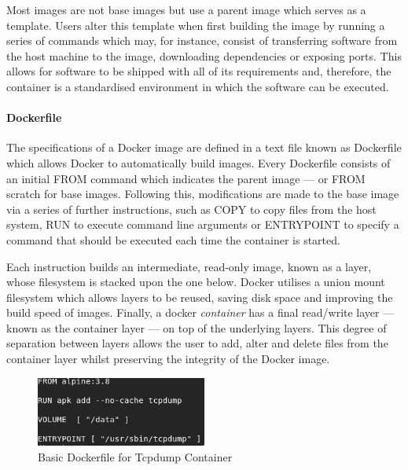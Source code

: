 \documentclass[msc,deptreport, cs]{infthesis} %
\begin{document}
Most images are not base images but use a parent image which serves as a template. Users alter this template when first building the image by running a series of commands which may, for instance, consist of transferring software from the host machine to the image, downloading dependencies or exposing ports. This allows for software to be shipped with all of its requirements and, therefore, the container is a standardised environment in which the software can be executed.


\paragraph*{Dockerfile}

   The specifications of a Docker image are defined in a text file known as Dockerfile which allows Docker to automatically build images. Every Dockerfile consists of an initial FROM command which indicates the parent image --- or FROM scratch for base images. Following this, modifications are made to the base image via a series of further instructions, such as COPY to copy files from the host system, RUN to execute command line arguments or ENTRYPOINT to specify a command that should be executed each time the container is started.
   
  Each instruction builds an intermediate, read-only image, known as a layer, whose filesystem is stacked upon the one below. Docker utilises a union mount filesystem which allows layers to be reused, saving disk space and improving the build speed of images. Finally, a docker \textit{container} has a final read/write layer --- known as the container layer --- on top of the underlying layers. This degree of separation between layers allows the user to add, alter and delete files from the container layer whilst preserving the integrity of the Docker image.
  
  \begin{figure}[h]
\centering
\includegraphics[width=0.5\textwidth]{dockerfile.png}
\caption{Basic Dockerfile for Tcpdump Container}
\end{figure}

  
  
\end{document}

